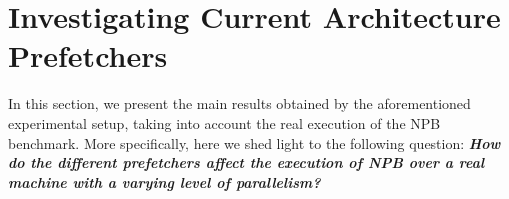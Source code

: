 \documentclass[AMA,final,STIX1COL]{WileyNJD-v2}
\newcommand\new[1]{{\color{red}\textbf{#1}}}
\newcommand{\fbm}[1]{\textcolor{red}{\bfseries \ul{fbm: #1} }\vspace{0.2cm}}
\begin{document}
\section{Investigating Current Architecture Prefetchers}\label{sec:real_ipc}

In this section, we present the main results obtained by the aforementioned experimental setup, taking into account the real execution of the NPB benchmark. 
More specifically, here we shed light to the following question: \new{\textit{How do the different prefetchers affect the execution of NPB over a real machine with a varying level of parallelism?}}




\end{document}

